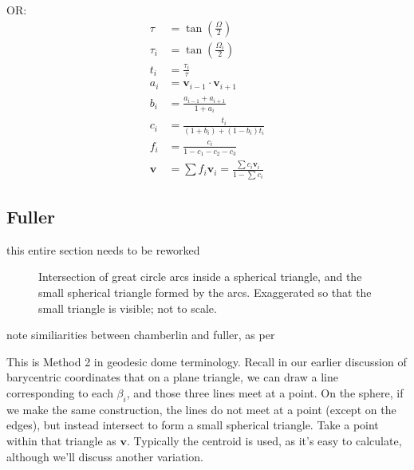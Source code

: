 \documentclass{amsart}[12pt]
\begin{document}
OR:
\begin{equation}\begin{split}
\tau   &= \tan\left(\frac{\Omega}{2}\right) \\
\tau_i &= \tan\left(\frac{\Omega_i}{2}\right) \\
t_i &= \frac{\tau_i}{\tau} \\
a_i &= \mathbf v_{i-1} \cdot \mathbf v_{i+1} \\
b_i &= \frac{a_{i-1} + a_{i+1}}{1 + a_i} \\
c_i &= \frac{t_i}{(1+b_i) + (1-b_i) t_i} \\
f_i &= \frac{c_i}{1 - c_1 - c_2 - c_3} \\
\mathbf v &= \sum f_i \mathbf v_i = \frac{\sum c_i \mathbf v_i }{ 1 - \sum c_i }
\end{split}\end{equation}

\subsection{Fuller}
this entire section needs to be reworked\cite{crider08}\cite{crider09}
\begin{figure}%
\caption{Intersection of great circle arcs inside a spherical triangle,
and the small spherical triangle formed by the arcs. Exaggerated so that the
small triangle is visible; not to scale.}
\label{fig:intlines}
\end{figure}
note similiarities between chamberlin and fuller, as per \cite{gray94}

This is Method 2 in geodesic dome terminology. Recall in our earlier discussion
of barycentric coordinates that on a plane triangle, we can draw a line
corresponding to each $\beta_i$, and those three lines meet at a point. On the
sphere, if we make the same construction, the lines do not meet at a point
(except on the edges), but instead intersect to form a small spherical
triangle. Take a point within that triangle as $\mathbf v$.
Typically the centroid is used, as it's easy to calculate,
although we'll discuss another variation.
\end{document}
